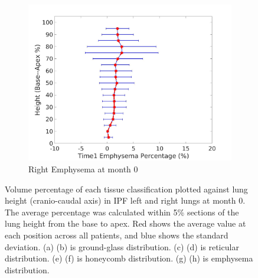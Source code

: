 \begin{figure}[H]
\begin{subfigure}{.42\linewidth}
  \includegraphics[width=\linewidth,trim={{.0\wd0} {.0\wd0} {.0\wd0} {.0\wd0}},clip]{QuantitativeAnalysis/Image/RightLungEmphysemaDiseaseAgainstHeightTime1.jpg}
  \caption{Right Emphysema at month 0}
  \label{fig:DiseaseAgainstHeightTime1-h}
\end{subfigure}
\caption{Volume percentage of each tissue classification plotted against lung height (cranio-caudal axis) in IPF left and right lungs at month 0. The average percentage was calculated within 5\% sections of the lung height from the base to apex. Red shows the average value at each position across all patients, and blue shows the standard deviation. (a) (b) is ground-glass distribution. (c) (d) is reticular distribution. (e) (f) is honeycomb distribution. (g) (h) is emphysema distribution.}
\label{fig:DiseaseAgainstHeightTime1}
\end{figure}

